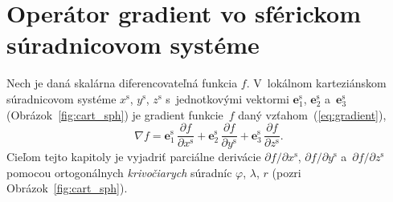 \documentclass[a4paper, 12pt]{book}
\let\vec\mathbf
\begin{document}
\section{Operátor gradient vo sférickom súradnicovom systéme}
\label{app:gradient_in_spherical_coordinates}

Nech je daná skalárna diferencovateľná funkcia $f$.  V~lokálnom karteziánskom 
súradnicovom systéme $x^{\mathrm{s}}$, $y^{\mathrm{s}}$, $z^{\mathrm{s}}$ 
s~jednotkovými vektormi $\vec e^\mathrm{s}_1$, $\vec e^\mathrm{s}_2$ a~$\vec 
e^\mathrm{s}_3$ (Obrázok~\ref{fig:cart_sph}) je gradient funkcie~$f$ daný 
vzťahom~(\ref{eq:gradient}),
%
\begin{equation}
\nabla f = \vec e^\mathrm{s}_1 \, \frac{\partial f}{\partial x^{\mathrm{s}}} 
+ \vec e^\mathrm{s}_2 \, \frac{\partial f}{\partial y^{\mathrm{s}}} + \vec 
e^\mathrm{s}_3 \, \frac{\partial f}{\partial z^{\mathrm{s}}}{.}
\end{equation}
%
Cieľom tejto kapitoly je vyjadriť parciálne derivácie $\partial f \slash 
\partial x^{\mathrm{s}}$, $\partial f \slash \partial y^{\mathrm{s}}$ 
a~$\partial f \slash \partial z^{\mathrm{s}}$ pomocou ortogonálnych 
\emph{krivočiarych} súradníc $\varphi$, $\lambda$, $r$ (pozri 
Obrázok~\ref{fig:cart_sph}).
\end{document}
